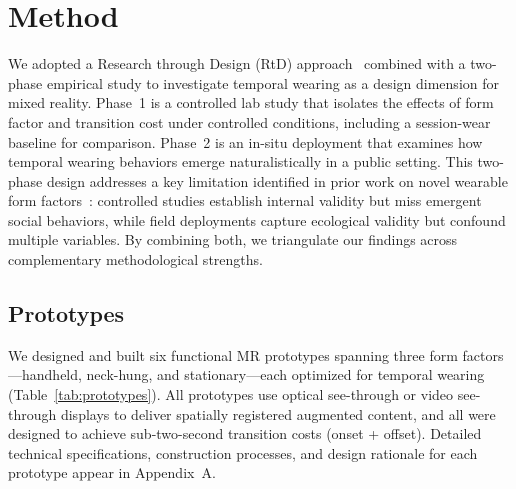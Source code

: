 
\section{Method}

We adopted a Research through Design (RtD) approach~\cite{zimmerman2007research} combined with a two-phase empirical study to investigate temporal wearing as a design dimension for mixed reality. Phase~1 is a controlled lab study that isolates the effects of form factor and transition cost under controlled conditions, including a session-wear baseline for comparison. Phase~2 is an in-situ deployment that examines how temporal wearing behaviors emerge naturalistically in a public setting. This two-phase design addresses a key limitation identified in prior work on novel wearable form factors~\cite{khurana2019detachable, gemperle1998wearability}: controlled studies establish internal validity but miss emergent social behaviors, while field deployments capture ecological validity but confound multiple variables. By combining both, we triangulate our findings across complementary methodological strengths.

\subsection{Prototypes}

We designed and built six functional MR prototypes spanning three form factors---handheld, neck-hung, and stationary---each optimized for temporal wearing (Table~\ref{tab:prototypes}). All prototypes use optical see-through or video see-through displays to deliver spatially registered augmented content, and all were designed to achieve sub-two-second transition costs (onset + offset). Detailed technical specifications, construction processes, and design rationale for each prototype appear in Appendix~A.

